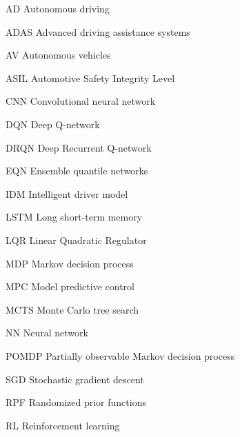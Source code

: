 \begin{acronyms}
\item[AD] Autonomous driving %
\item[ADAS] Advanced driving assistance systems %
\item[AV] Autonomous vehicles %
\item[ASIL] Automotive Safety Integrity Level %
\item[CNN] Convolutional neural network %
\item[DQN] Deep Q-network %
\item[DRQN] Deep Recurrent Q-network %
\item[EQN] Ensemble quantile networks %
\item[IDM] Intelligent driver model %
\item[LSTM] Long short-term memory %
\item[LQR] Linear Quadratic Regulator %
\item[MDP] Markov decision process %
\item[MPC] Model predictive control %
\item[MCTS] Monte Carlo tree search %
\item[NN] Neural network %
\item[POMDP] Partially observable Markov decision process %
\item[SGD] Stochastic gradient descent %
\item[RPF] Randomized prior functions %
\item[RL] Reinforcement learning %

\end{acronyms}




